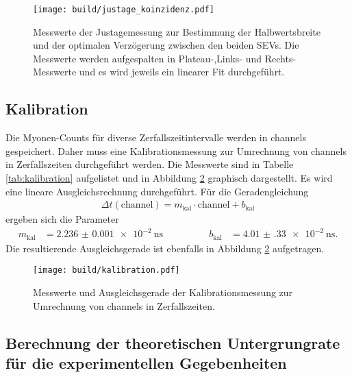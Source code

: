 \begin{figure}
  \centering
  \texttt{[image: build/justage\_koinzidenz.pdf]}
  \caption{Messwerte der Justagemessung zur Bestimmung der Halbwertsbreite und der optimalen Verzögerung zwischen den beiden SEVs.
  Die Messwerte werden aufgespalten in Plateau-,Links- und Rechts-Messwerte und es wird jeweils ein linearer Fit durchgeführt.}
  \label{fig:justage}
\end{figure}

\subsection{Kalibration}
\label{sec:kalibration}

Die Myonen-Counts für diverse Zerfallszeitintervalle werden in channels gespeichert.
Daher muss eine Kalibrationsmessung zur Umrechnung von channels in Zerfallszeiten
durchgeführt werden. Die Messwerte sind in Tabelle \ref{tab:kalibration} aufgelistet
und in Abbildung \ref{fig:kalibration} graphisch dargestellt. Es wird eine lineare Ausgleichsrechnung
durchgeführt. Für die Geradengleichung
\begin{align}
  \Delta t (\text{channel}) = m_\text{kal} \cdot \text{channel} + b_\text{kal}
\end{align}
ergeben sich die Parameter
\begin{align}
  m_\text{kal} &= \SI{2.236(1)e-2}{\nano\second} \qquad \qquad &b_\text{kal} &= \SI{4.01(33)e-2}{\nano\second}.
\end{align}
Die resultierende Ausgleichsgerade ist ebenfalls in Abbildung \ref{fig:kalibration} aufgetragen.

\begin{figure}
  \centering
  \texttt{[image: build/kalibration.pdf]}
  \caption{Messwerte und Ausgleichsgerade der Kalibrationsmessung zur Umrechnung von channels in Zerfallszeiten.}
  \label{fig:kalibration}
\end{figure}

\subsection{Berechnung der theoretischen Untergrungrate für die experimentellen Gegebenheiten}
\label{sec:untergrundtheo}

